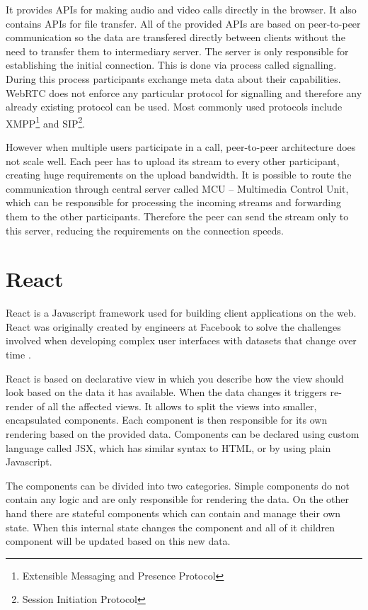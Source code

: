 \documentclass[
  digital, %
  table,   %
  lof,     %
  nolot,     %
]{fithesis3}
\begin{document}
It provides APIs for making audio and video calls directly in the browser. It also contains APIs for file transfer. All of the provided APIs are based on peer-to-peer communication so the data are transfered directly between clients without the need to transfer them to intermediary server. The server is only responsible for establishing the initial connection. This is done via process called signalling. During this process participants exchange meta data about their capabilities. WebRTC does not enforce any particular protocol for signalling and therefore any already existing protocol can be used. Most commonly used protocols include XMPP\footnote{Extensible Messaging and Presence Protocol} and SIP\footnote{Session Initiation Protocol}. 

However when multiple users participate in a call, peer-to-peer architecture does not scale well. Each peer has to upload its stream to every other participant, creating huge requirements on the upload bandwidth. It is possible to route the communication through central server called MCU -- Multimedia Control Unit, which can be responsible for processing the incoming streams and forwarding them to the other participants. Therefore the peer can send the stream only to this server, reducing the requirements on the connection speeds.

\section{React}
React is a Javascript framework used for building client applications on the web. React was originally created by engineers at Facebook to solve the challenges involved when developing complex user interfaces with datasets that change over time \cite{react}.

React is based on declarative view in which you describe how the view should look based on the data it has available. When the data changes it triggers re-render of all the affected views. It allows to split the views into smaller, encapsulated components. Each component is then responsible for its own rendering based on the provided data. Components can be declared using custom language called JSX, which has similar syntax to HTML, or by using plain Javascript. 

The components can be divided into two categories. Simple components do not contain any logic and are only responsible for rendering the data. On the other hand there are stateful components which can contain and manage their own state. When this internal state changes the component and all of it children component will be updated based on this new data.
\end{document}
